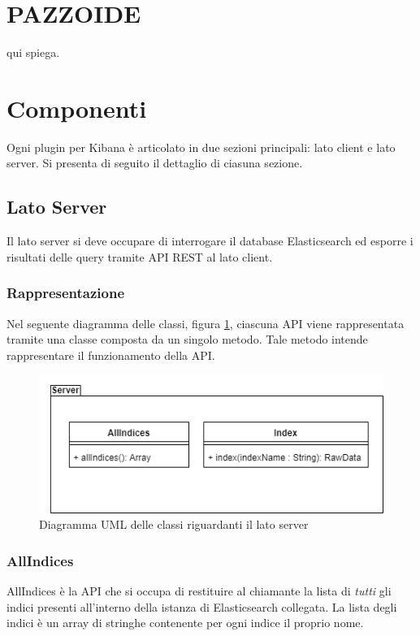 
\section{PAZZOIDE}
qui spiega.

\section{Componenti}

Ogni plugin per Kibana è articolato in due sezioni principali: lato client e lato server. Si presenta di seguito il dettaglio di ciasuna sezione.

\subsection{Lato Server}
Il lato server si deve occupare di interrogare il database Elasticsearch ed esporre i risultati delle query tramite API REST al lato client.
\subsubsection{Rappresentazione}
Nel seguente diagramma delle classi, figura \ref{img:diagrammaClassiServer}, ciascuna API viene rappresentata tramite una classe composta da un singolo metodo. Tale metodo intende rappresentare il funzionamento della API.


\begin{figure}[h]
	\centering
	\includegraphics[width=1\textwidth]{Images/DiagrammaClassiServer.png}
	\caption{Diagramma UML delle classi riguardanti il lato server}
	\label{img:diagrammaClassiServer}
\end{figure}

\subsubsection{AllIndices}
AllIndices è la API che si occupa di restituire al chiamante la lista di \emph{tutti} gli indici presenti all'interno della istanza di Elasticsearch collegata. La lista degli indici è un array di stringhe contenente per ogni indice il proprio nome.

